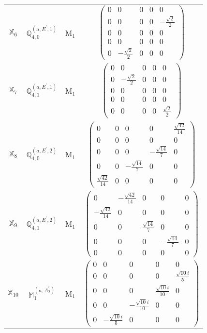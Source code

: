 \documentclass[fleqn,10pt,landscape]{article}
\begin{document}
\begin{itemize}
\begin{center}
\begin{longtable}{c|c|c|c}
$ \mathbb{X}_{6} $ & $\mathbb{Q}_{4,0}^{(a,E^{\prime},1)}$ & M$_{1}$ & $\begin{pmatrix} 0 & 0 & 0 & 0 & 0 \\ 0 & 0 & 0 & 0 & - \frac{\sqrt{2}}{2} \\ 0 & 0 & 0 & 0 & 0 \\ 0 & 0 & 0 & 0 & 0 \\ 0 & - \frac{\sqrt{2}}{2} & 0 & 0 & 0 \end{pmatrix}$ \\
$ \mathbb{X}_{7} $ & $\mathbb{Q}_{4,1}^{(a,E^{\prime},1)}$ & M$_{1}$ & $\begin{pmatrix} 0 & 0 & 0 & 0 & 0 \\ 0 & - \frac{\sqrt{2}}{2} & 0 & 0 & 0 \\ 0 & 0 & 0 & 0 & 0 \\ 0 & 0 & 0 & 0 & 0 \\ 0 & 0 & 0 & 0 & \frac{\sqrt{2}}{2} \end{pmatrix}$ \\
$ \mathbb{X}_{8} $ & $\mathbb{Q}_{4,0}^{(a,E^{\prime},2)}$ & M$_{1}$ & $\begin{pmatrix} 0 & 0 & 0 & 0 & \frac{\sqrt{42}}{14} \\ 0 & 0 & 0 & 0 & 0 \\ 0 & 0 & 0 & - \frac{\sqrt{14}}{7} & 0 \\ 0 & 0 & - \frac{\sqrt{14}}{7} & 0 & 0 \\ \frac{\sqrt{42}}{14} & 0 & 0 & 0 & 0 \end{pmatrix}$ \\
$ \mathbb{X}_{9} $ & $\mathbb{Q}_{4,1}^{(a,E^{\prime},2)}$ & M$_{1}$ & $\begin{pmatrix} 0 & - \frac{\sqrt{42}}{14} & 0 & 0 & 0 \\ - \frac{\sqrt{42}}{14} & 0 & 0 & 0 & 0 \\ 0 & 0 & \frac{\sqrt{14}}{7} & 0 & 0 \\ 0 & 0 & 0 & - \frac{\sqrt{14}}{7} & 0 \\ 0 & 0 & 0 & 0 & 0 \end{pmatrix}$ \\
$ \mathbb{X}_{10} $ & $\mathbb{M}_{1}^{(a,A_{2}^{\prime})}$ & M$_{1}$ & $\begin{pmatrix} 0 & 0 & 0 & 0 & 0 \\ 0 & 0 & 0 & 0 & \frac{\sqrt{10} i}{5} \\ 0 & 0 & 0 & \frac{\sqrt{10} i}{10} & 0 \\ 0 & 0 & - \frac{\sqrt{10} i}{10} & 0 & 0 \\ 0 & - \frac{\sqrt{10} i}{5} & 0 & 0 & 0 \end{pmatrix}$ \\

\end{longtable}
\end{center}
\end{itemize}
\end{document}
